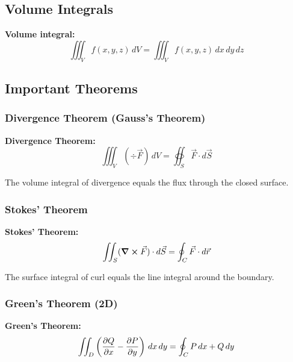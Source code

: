 \documentclass[12pt,a4paper]{article}
\begin{document}
\subsection{Volume Integrals}
\begin{formulabox}
\textbf{Volume integral:}
\begin{equation}
\iiint_V f(x,y,z) \, dV = \iiint_V f(x,y,z) \, dx \, dy \, dz
\end{equation}
\end{formulabox}

\subsection{Important Theorems}
\subsubsection{Divergence Theorem (Gauss's Theorem)}
\begin{importantbox}
\textbf{Divergence Theorem:}
\begin{equation}
\iiint_V (\div\vec{F}) \, dV = \oiint_S \vec{F} \cdot d\vec{S}
\end{equation}

The volume integral of divergence equals the flux through the closed surface.
\end{importantbox}

\subsubsection{Stokes' Theorem}
\begin{importantbox}
\textbf{Stokes' Theorem:}
\begin{equation}
\iint_S (\curl\vec{F}) \cdot d\vec{S} = \oint_C \vec{F} \cdot d\vec{r}
\end{equation}

The surface integral of curl equals the line integral around the boundary.
\end{importantbox}

\subsubsection{Green's Theorem (2D)}
\begin{importantbox}
\textbf{Green's Theorem:}
\begin{equation}
\iint_D \left(\pdv{Q}{x} - \pdv{P}{y}\right) \, dx \, dy = \oint_C P \, dx + Q \, dy
\end{equation}
\end{importantbox}
\end{document}
